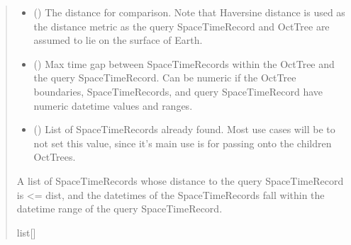 \documentclass[letterpaper,10pt,english]{sphinxmanual}
\begin{document}
\begin{fulllineitems}
\begin{fulllineitems}
\begin{quote}
\begin{description}
\begin{itemize}
\item {} 
\sphinxAtStartPar
{} () \textendash{} The distance for comparison. Note that Haversine distance is used
as the distance metric as the query SpaceTimeRecord and OctTree are
assumed to lie on the surface of Earth.

\item {} 
\sphinxAtStartPar
{} () \textendash{} Max time gap between SpaceTimeRecords within the OctTree and the
query SpaceTimeRecord. Can be numeric if the OctTree boundaries,
SpaceTimeRecords, and query SpaceTimeRecord have numeric datetime
values and ranges.

\item {} 
\sphinxAtStartPar
{} (\sphinxstyleliteralemphasis{\sphinxupquote{{[}}}{\hyperref[\detokenize{record:GeoSpatialTools.record.SpaceTimeRecord}]{\sphinxcrossref{\sphinxstyleliteralemphasis{\sphinxupquote{SpaceTimeRecord}}}}}\sphinxstyleliteralemphasis{\sphinxupquote{{]} }}\sphinxstyleliteralemphasis{\sphinxupquote{| }}) \textendash{} List of SpaceTimeRecords already found. Most use cases will be to
not set this value, since it’s main use is for passing onto the
children OctTrees.

\end{itemize}

\sphinxAtStartPar
A list of SpaceTimeRecords whose distance to the
query SpaceTimeRecord is \textless{}= dist, and the datetimes of the
SpaceTimeRecords fall within the datetime range of the query
SpaceTimeRecord.

\sphinxAtStartPar
list{[}{\hyperref[\detokenize{record:GeoSpatialTools.record.SpaceTimeRecord}]{}}{]}

\end{description}\end{quote}

\end{fulllineitems}



\end{fulllineitems}
\end{document}
